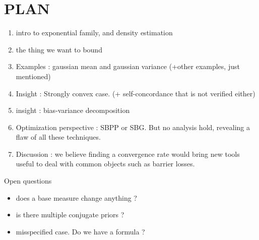\documentclass[twoside]{article}
\let\oldsection\section
\renewcommand{\section}[1]{\oldsection{\uppercase{#1}}}
\begin{document}
	
	




















\clearpage
\section{Plan}

\begin{enumerate}
	\item intro to exponential family, and density estimation
	\item the thing we want to bound
	\item Examples : gaussian mean and gaussian variance (+other examples, just mentioned)
	\item Insight : Strongly convex case. (+ self-concordance that is not verified either)
	\item insight : bias-variance decomposition
	\item Optimization perspective : SBPP or SBG. But no analysis hold, revealing a flaw of all these techniques.
	\item Discussion : we believe finding a convergence rate would bring new tools useful to deal with common objects such as barrier losses.
\end{enumerate}

Open questions
\begin{itemize}
	\item does a base measure change anything ?
	\item is there multiple conjugate priors ?
	\item misspecified case. Do we have a   formula ?
\end{itemize}
\end{document}
